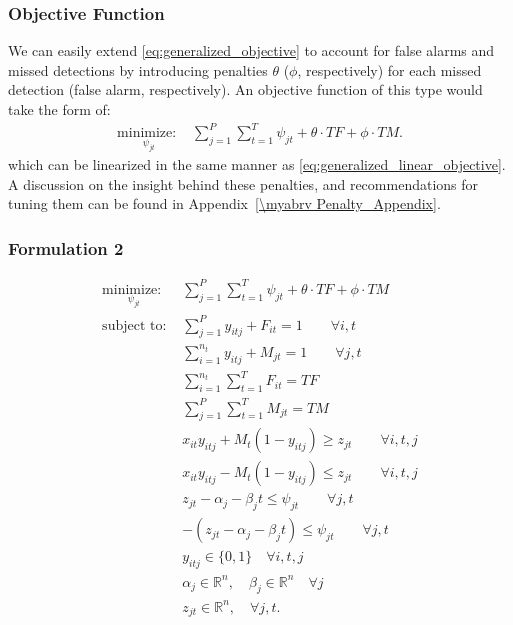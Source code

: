 \subsubsection{Objective Function}
We can easily extend \eqref{eq:generalized_objective} to account for false alarms and missed detections by introducing penalties $\theta$ ($\phi$, respectively) for each missed detection (false alarm, respectively). An objective function of this type would take the form of: 
\begin{align}
\underset{\psi_{jt}}{\text{minimize: }} & \sum_{j=1}^{P} \sum_{t=1}^{T} \psi_{jt} + \theta \cdot TF + \phi \cdot TM.
\end{align}
which can be linearized in the same manner as \eqref{eq:generalized_linear_objective}. A discussion on the insight behind these penalties, and recommendations for tuning them can be found in Appendix~\ref{\myabrv Penalty_Appendix}.

\subsubsection{Formulation 2}
\begin{align}
\underset{\psi_{jt}}{\text{minimize: }} & \sum_{j=1}^{P} \sum_{t=1}^{T} \psi_{jt} + \theta \cdot TF + \phi \cdot TM\\
\text{subject to: }	& \sum_{j=1}^{P} y_{itj} + F_{it} = 1 \qquad \forall i,t \nonumber \\
				& \sum_{i=1}^{n_{t}} y_{itj} + M_{jt} = 1 \qquad \forall j,t \nonumber\\
				& \sum_{i=1}^{n_{t}} \sum_{t=1}^{T} F_{it} = TF \nonumber \\
				& \sum_{j=1}^{P} \sum_{t=1}^{T} M_{jt} = TM \nonumber \\
				& x_{it}y_{itj} + M_{t}(1-y_{itj}) \geq z_{jt} \qquad \forall i,t,j \nonumber \\
				& x_{it}y_{itj} - M_{t}(1-y_{itj}) \leq z_{jt} \qquad \forall i,t,j \nonumber \\
				& z_{jt} - \alpha_{j} - \beta_{j}t \leq \psi_{jt} \qquad \forall j,t \nonumber \\
				& -(z_{jt} - \alpha_{j} - \beta_{j}t) \leq \psi_{jt} \qquad \forall j,t \nonumber \\
				& y_{itj} \in \{0,1\} \quad \forall i,t,j \nonumber \\
				& \alpha_{j} \in \mathbb{R}^n,\quad \beta_{j} \in \mathbb{R}^n \quad \forall j \nonumber\\
				& z_{jt} \in \mathbb{R}^n, \quad \forall j,t. \nonumber
\end{align}

